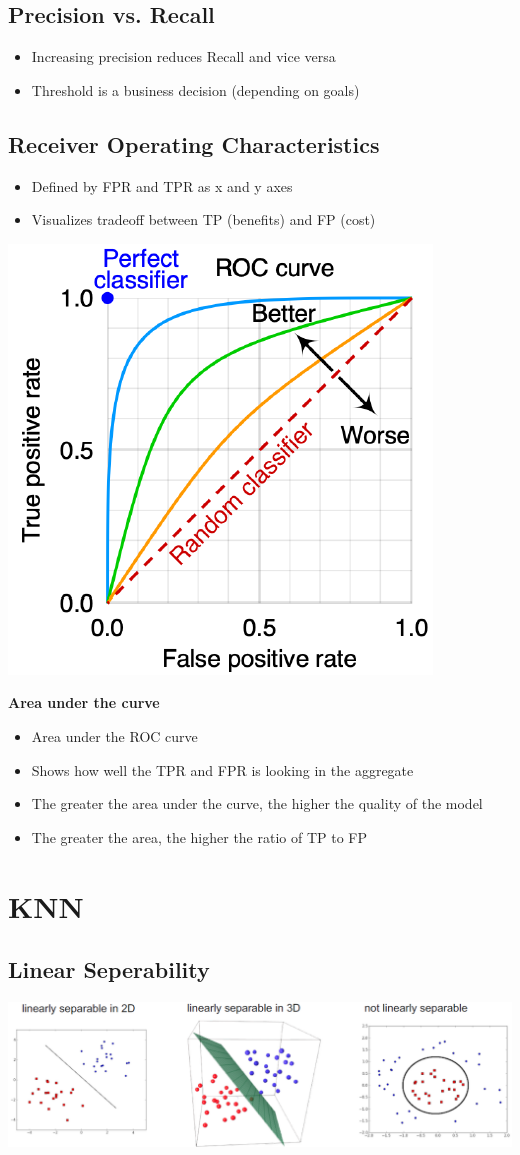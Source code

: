 \subsection{Precision vs. Recall}
\begin{itemize}
    \item Increasing precision reduces Recall and vice versa
    \item Threshold is a business decision (depending on goals)
\end{itemize}

\subsection{Receiver Operating Characteristics}
\begin{itemize}
    \item Defined by FPR and TPR as x and y axes
    \item Visualizes tradeoff between TP (benefits) and FP (cost)
\end{itemize}
\begin{center}
    \includegraphics[width=0.4\linewidth]{./img/roc.png}
\end{center}
\textbf{Area under the curve}
\begin{itemize}
    \item Area under the ROC curve
    \item Shows how well the TPR and FPR is looking in the aggregate
    \item The greater the area under the curve, the higher the quality of the model
    \item The greater the area, the higher the ratio of TP to FP
\end{itemize}

\section{KNN}
\subsection{Linear Seperability}
\includegraphics[width=1\linewidth]{./img/linear_sep.png}

